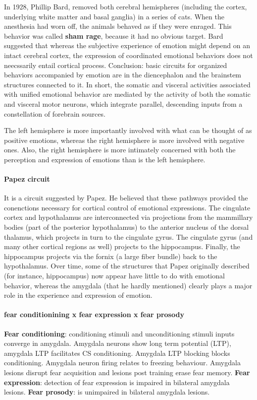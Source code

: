 \documentclass[12pt,article,oneside,a4paper]{memoir}
\begin{document}
In 1928, Phillip Bard, removed both cerebral hemispheres (including the cortex,
underlying white matter and basal ganglia) in a series of cats.
When the anesthesia had worn off, the animals behaved as if they were enraged.
This behavior was called \textbf{sham rage}, because it had no obvious target.
Bard suggested that whereas the subjective experience of emotion might depend
on an intact cerebral cortex, the expression of coordinated emotional behaviors
does not neecssarily entail cortical process. Conclusion: basic circuits for
organized behaviors accompanied by emotion are in the diencephalon and the
brainstem structures connected to it.
In short, the somatic and visceral activities associated with unified emotional
behavior are mediated by the activity of both the somatic and visceral motor
neurons, which integrate parallel, descending inputs from a constellation of 
forebrain sources. 

The left hemisphere is more importantly involved with what can be thought of as
positive emotions, whereas the right hemisphere is more involved with negative
ones. Also, the right hemisphere is more intimately concerned with both the 
perception and expression of emotions than is the left hemisphere.

\paragraph{Papez circuit}
It is a circuit suggested by Papez. He believed that these pathways provided
the conenctions necessary for cortical control of emotional expressions.
The cingulate cortex and hypothalamus are interconnected via projections from the
mammillary bodies (part of the posterior hypothalamus) to the anterior nucleus
of the dorsal thalamus, which projects in turn to the cingulate gyrus.
The cingulate gyrus (and many other cortical regions as well) projects to the
hippocampus. Finally, the hippocampus projects via the fornix (a large fiber
bundle) back to the hypothalamus. Over time, some of the structures that Papez
originally described (for instance, hippocampus) now appear have little to do 
with emotional behavior, whereas the amygdala (that he hardly mentioned) clearly
plays a major role in the experience and expression of emotion.

\paragraph{fear conditionining x fear expression x fear prosody}
\textbf{Fear conditioning}: conditioning stimuli and unconditioning stimuli inputs
converge in amygdala. Amygdala neurons show long term potential (LTP), amygdala
LTP facilitates CS conditioning. Amygdala LTP blocking blocks conditioning.
Amygdala neuron firing relates to freezing behaviour. Amygdala lesions disrupt
fear acquisition and lesions post training erase fear memory.
\textbf{Fear expression}: detection of fear expression is impaired in bilateral
amygdala lesions.
\textbf{Fear prosody}: is unimpaired in bilateral amygdala lesions.
\end{document}
